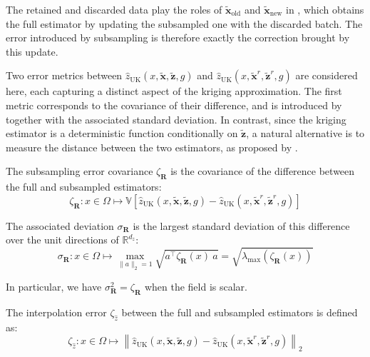 The retained and discarded data play the roles of $\tilde{\mathbf{x}}_{\mathrm{old}}$ and $\tilde{\mathbf{x}}_{\mathrm{new}}$ in , which obtains the full estimator by updating the subsampled one with the discarded batch. The error introduced by subsampling is therefore exactly the correction brought by this update.

Two error metrics between $\hat{z}_{\mathrm{UK}}(x,\tilde{\mathbf{x}},\tilde{\mathbf{z}},g)$ and $\hat{z}_{\mathrm{UK}}(x,\tilde{\mathbf{x}}^r,\tilde{\mathbf{z}}^r,g)$ are considered here, each capturing a distinct aspect of the kriging approximation. The first metric corresponds to the covariance of their difference, and is introduced by  together with the associated standard deviation. In contrast, since the kriging estimator is a deterministic function conditionally on $\tilde{\mathbf{z}}$, a natural alternative is to measure the distance between the two estimators, as proposed by .

\begin{definition}\label{th:covariance_error}
	The subsampling error covariance $\zeta_{\mathbf{R}}$ is the covariance of the difference between the full and subsampled estimators:
	\begin{equation}
		\zeta_{\mathbf{R}}:x\in\Omega\mapsto\mathbb{V}\left[\hat{z}_{\mathrm{UK}}(x,\tilde{\mathbf{x}},\tilde{\mathbf{z}},g)-\hat{z}_{\mathrm{UK}}(x,\tilde{\mathbf{x}}^r,\tilde{\mathbf{z}}^r,g)\right]
	\end{equation}

	The associated deviation $\sigma_{\mathbf{R}}$ is the largest standard deviation of this difference over the unit directions of $\mathbb{R}^{d_z}$:
	\begin{equation}
		\sigma_{\mathbf{R}}:x\in\Omega\mapsto\max_{\|a\|_2=1}\sqrt{a^\top \zeta_{\mathbf{R}}(x)\:a}=\sqrt{\lambda_{\max}\left(\zeta_{\mathbf{R}}(x)\right)}
	\end{equation}

	In particular, we have $\sigma_{\mathbf{R}}^2=\zeta_{\mathbf{R}}$ when the field is scalar.
\end{definition}

\begin{definition}\label{th:interpolation_error}
	The interpolation error $\zeta_{\hat{z}}$ between the full and subsampled estimators is defined as:
	\begin{equation}
		\zeta_{\hat{z}}:x\in\Omega\mapsto\left\|\hat{z}_{\mathrm{UK}}(x,\tilde{\mathbf{x}},\tilde{\mathbf{z}},g)-\hat{z}_{\mathrm{UK}}(x,\tilde{\mathbf{x}}^r,\tilde{\mathbf{z}}^r,g)\right\|_2
	\end{equation}
\end{definition}


